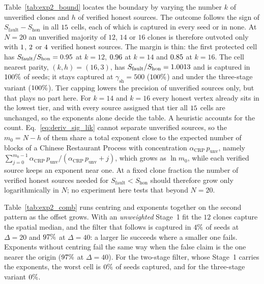\documentclass[11pt,a4paper]{article}
\theoremstyle{definition}
\theoremstyle{remark}
\begin{document}
Table~\ref{tab:exp2_bound} locates the boundary by varying the number $k$ of unverified clones and $h$ of verified honest sources. The outcome follows the sign of $S_{\mathrm{fault}} - S_{\mathrm{hon}}$ in all $15$ cells, each of which is captured in every seed or in none. At $N = 20$ an unverified majority of $12$, $14$ or $16$ clones is therefore outvoted only with $1$, $2$ or $4$ verified honest sources. The margin is thin: the first protected cell has $S_{\mathrm{fault}}/S_{\mathrm{hon}} = 0.95$ at $k=12$, $0.96$ at $k=14$ and $0.85$ at $k=16$. The cell nearest parity, $(k,h) = (16,3)$, has $S_{\mathrm{fault}}/S_{\mathrm{hon}} = 1.0013$ and is captured in $100\%$ of seeds; it stays captured at $\gamma_{\mathrm{sh}} = 500$ ($100\%$) and under the three-stage variant ($100\%$). Tier capping lowers the precision of unverified sources only, but that plays no part here. For $k = 14$ and $k = 16$ every honest vertex already sits in the lowest tier, and with every source assigned that tier all $15$ cells are unchanged, so the exponents alone decide the table. A heuristic accounts for the count. Eq.~\eqref{eq:deriv_sig_lik} cannot separate unverified sources, so the $m_0 = N - h$ of them share a total exponent close to the expected number of blocks of a Chinese Restaurant Process with concentration $\alpha_{\mathrm{CRP}}\,p_{\mathrm{unv}}$, namely $\sum_{j=0}^{m_0-1} \alpha_{\mathrm{CRP}}\,p_{\mathrm{unv}} / (\alpha_{\mathrm{CRP}}\,p_{\mathrm{unv}} + j)$, which grows as $\ln m_0$, while each verified source keeps an exponent near one. At a fixed clone fraction the number of verified honest sources needed for $S_{\mathrm{fault}} < S_{\mathrm{hon}}$ should therefore grow only logarithmically in $N$; no experiment here tests that beyond $N = 20$.

Table~\ref{tab:exp2_comb} runs centring and exponents together on the second pattern as the offset grows. With an \emph{unweighted} Stage~1 fit the $12$ clones capture the spatial median, and the filter that follows is captured in $4\%$ of seeds at $\Delta = 20$ and $97\%$ at $\Delta = 40$: a larger lie succeeds where a smaller one fails. Exponents without centring fail the same way when the false claim is the one nearer the origin ($97\%$ at $\Delta = 40$). For the two-stage filter, whose Stage~1 carries the exponents, the worst cell is $0\%$ of seeds captured, and for the three-stage variant $0\%$.
\end{document}
